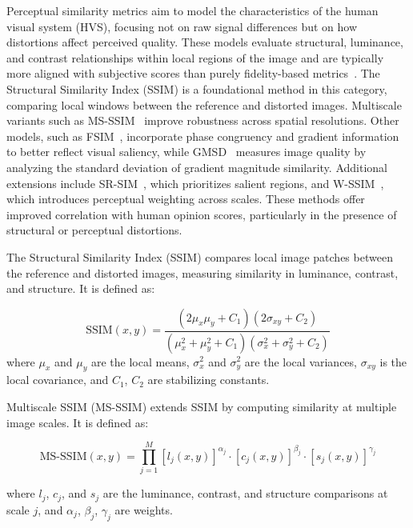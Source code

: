 Perceptual similarity metrics aim to model the characteristics of the human visual system (HVS), focusing not on raw signal differences but on how distortions affect perceived quality. These models evaluate structural, luminance, and contrast relationships within local regions of the image and are typically more aligned with subjective scores than purely fidelity-based metrics~\cite{wang2004image,chandler2007vsnr}. The Structural Similarity Index (SSIM) is a foundational method in this category, comparing local windows between the reference and distorted images. Multiscale variants such as MS-SSIM~\cite{Wang2003MSSSIM} improve robustness across spatial resolutions. Other models, such as FSIM~\cite{Zhang2011FSIM}, incorporate phase congruency and gradient information to better reflect visual saliency, while GMSD~\cite{Xue2014GMSD} measures image quality by analyzing the standard deviation of gradient magnitude similarity. Additional extensions include SR-SIM~\cite{Zhang2012SRSIM}, which prioritizes salient regions, and W-SSIM~\cite{Engelke2011WSSIM}, which introduces perceptual weighting across scales. These methods offer improved correlation with human opinion scores, particularly in the presence of structural or perceptual distortions.

The Structural Similarity Index (SSIM) compares local image patches between the reference and distorted images, measuring similarity in luminance, contrast, and structure. It is defined as:

\begin{equation}
\text{SSIM}(x, y) = \frac{(2\mu_x \mu_y + C_1)(2\sigma_{xy} + C_2)}{(\mu_x^2 + \mu_y^2 + C_1)(\sigma_x^2 + \sigma_y^2 + C_2)}
\end{equation}
where $\mu_x$ and $\mu_y$ are the local means, $\sigma_x^2$ and $\sigma_y^2$ are the local variances, $\sigma_{xy}$ is the local covariance, and $C_1$, $C_2$ are stabilizing constants.

Multiscale SSIM (MS-SSIM) extends SSIM by computing similarity at multiple image scales. It is defined as:

\begin{equation}
\text{MS-SSIM}(x, y) = \prod_{j=1}^{M} {[l_j(x, y)]}^{\alpha_j} \cdot {[c_j(x, y)]}^{\beta_j} \cdot {[s_j(x, y)]}^{\gamma_j}
\end{equation}

where $l_j$, $c_j$, and $s_j$ are the luminance, contrast, and structure comparisons at scale $j$, and $\alpha_j$, $\beta_j$, $\gamma_j$ are weights.

